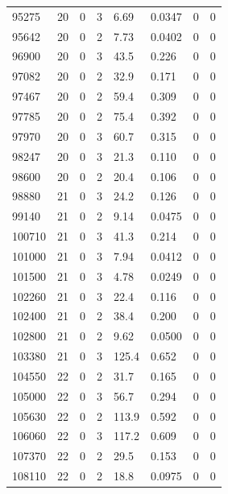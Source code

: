\documentclass[preview]{standalone}
\begin{document}
{{{{{{{{{{\begin{tabular}{L{1.2cm}C{1.2cm} C{0.3cm}C{0.5cm} C{1.4cm}C{1.4cm} C{1.4cm}C{1.4cm}}
  95275  &    20  & 0     &  3 &  6.69  & 0.0347  & 0 &  0   \\ 
  95642  &    20  & 0     &  2 &  7.73  & 0.0402  & 0 &  0   \\ 
  96900  &    20  & 0     &  3 &  43.5  & 0.226  & 0 &  0   \\ 
  97082  &    20  & 0     &  2 &  32.9  & 0.171  & 0 &  0   \\ 
  97467  &    20  & 0     &  2 &  59.4  & 0.309  & 0 &  0   \\ 
  97785  &    20  & 0     &  2 &  75.4  & 0.392  & 0 &  0   \\ 
  97970  &    20  & 0     &  3 &  60.7  & 0.315  & 0 &  0   \\ 
  98247  &    20  & 0     &  3 &  21.3  & 0.110  & 0 &  0   \\ 
  98600  &    20  & 0     &  2 &  20.4  & 0.106  & 0 &  0   \\ 
  98880  &    21  & 0     &  3 &  24.2  & 0.126  & 0 &  0   \\ 
  99140  &    21  & 0     &  2 &  9.14  & 0.0475  & 0 &  0   \\ 
  100710  &    21  & 0     &  3 &  41.3  & 0.214  & 0 &  0   \\ 
  101000  &    21  & 0     &  3 &  7.94  & 0.0412  & 0 &  0   \\ 
  101500  &    21  & 0     &  3 &  4.78  & 0.0249  & 0 &  0   \\ 
  102260  &    21  & 0     &  3 &  22.4  & 0.116  & 0 &  0   \\ 
  102400  &    21  & 0     &  2 &  38.4  & 0.200  & 0 &  0   \\ 
  102800  &    21  & 0     &  2 &  9.62  & 0.0500  & 0 &  0   \\ 
  103380  &    21  & 0     &  3 &  125.4  & 0.652  & 0 &  0   \\ 
  104550  &    22  & 0     &  2 &  31.7  & 0.165  & 0 &  0   \\ 
  105000  &    22  & 0     &  3 &  56.7  & 0.294  & 0 &  0   \\ 
  105630  &    22  & 0     &  2 &  113.9  & 0.592  & 0 &  0   \\ 
  106060  &    22  & 0     &  3 &  117.2  & 0.609  & 0 &  0   \\ 
  107370  &    22  & 0     &  2 &  29.5  & 0.153  & 0 &  0   \\ 
  108110  &    22  & 0     &  2 &  18.8  & 0.0975  & 0 &  0   \\ 
\hline 
\end{tabular} 

}}}}}}}}}}
\end{document}
